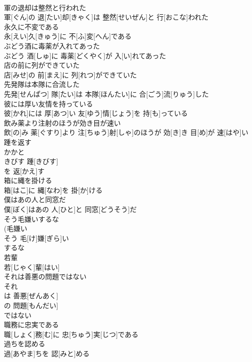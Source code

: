 \documentclass[8pt]{extreport}
\begin{document}
\begin{CJK}{UTF8}{min}
\\	軍の退却は整然と行われた	
\\	軍[ぐん]の 退[たい]却[きゃく]は 整然[せいぜん]と 行[おこな]われた
\\	永久に不変である	
\\	永[えい]久[きゅう]に 不[ふ]変[へん]である
\\	ぶどう酒に毒薬が入れてあった	
\\	ぶどう 酒[しゅ]に 毒薬[どくやく]が 入[い]れてあった
\\	店の前に列ができていた	
\\	店[みせ]の 前[まえ]に 列[れつ]ができていた
\\	先発隊は本隊に合流した	
\\	先発[せんぱつ] 隊[たい]は 本隊[ほんたい]に 合[ごう]流[りゅう]した
\\	彼には厚い友情を持っている	
\\	彼[かれ]には 厚[あつ]い 友[ゆう]情[じょう]を 持[も]っている
\\	飲み薬より注射のほうが効き目が速い	
\\	飲[の]み 薬[ぐすり]より 注[ちゅう]射[しゃ]のほうが 効[き]き 目[め]が 速[はや]い
\\	踵を返す	
\\	かかと 
\\	きびす	踵[きびす]
\\	を 返[かえ]す 
\\	箱に縄を掛ける	
\\	箱[はこ]に 縄[なわ]を 掛[か]ける
\\	僕はあの人と同窓だ	
\\	僕[ぼく]はあの 人[ひと]と 同窓[どうそう]だ
\\	そう毛嫌いするな	
\\	(毛嫌い 
\\	そう 毛[け]嫌[ぎら]い 
\\	するな
\\	若輩	
\\	若[じゃく]輩[はい]
\\	それは善悪の問題ではない	
\\	それ 
\\	は 善悪[ぜんあく]
\\	の 問題[もんだい]
\\	ではない
\\	職務に忠実である	
\\	職[しょく]務[む]に 忠[ちゅう]実[じつ]である
\\	過ちを認める	
\\	過[あやま]ちを 認[みと]める

\end{CJK}
\end{document}
